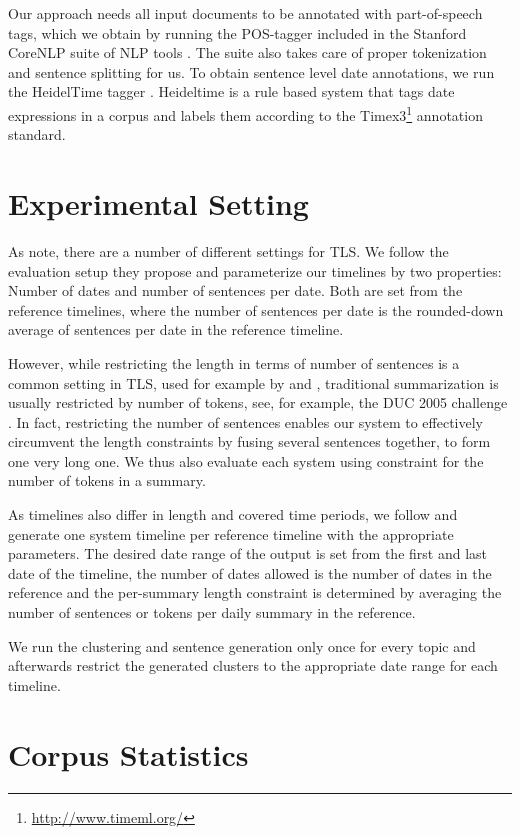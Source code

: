 \documentclass[a4paper,BCOR=10mm]{report}
\numberwithin{lemma}{chapter}
\numberwithin{definition}{chapter}
\begin{document}
Our approach needs all input documents to be annotated with part-of-speech tags, which we obtain by running the POS-tagger included in the Stanford CoreNLP suite of NLP tools \citep{stanford-corenlp}. The suite also takes care of proper tokenization and sentence splitting for us.
To obtain sentence level date annotations, we run the HeidelTime tagger \citet{heideltime}. Heideltime is a rule based system that tags date expressions in a corpus and labels them according to the Timex3\footnote{\url{http://www.timeml.org/}} annotation standard.

\section{Experimental Setting} \label{sec:setup-settings}

As \citet{markert} note, there are a number of different settings for TLS.
We follow the evaluation setup they propose and parameterize our timelines by two properties: Number of dates and number of sentences per date. Both are set from the reference timelines, where the number of sentences per date is the rounded-down average of sentences per date in the reference timeline.

However, while restricting the length in terms of number of sentences is a common setting in TLS, used for example by \citet{chieu} and \citet{yan-trans}, traditional summarization is usually restricted by number of tokens, see, for example, the DUC 2005 challenge \citep{duc2005}. In fact, restricting the number of sentences enables our system to effectively circumvent the length constraints by fusing several sentences together, to form one very long one.
We thus also evaluate each system using constraint for the number of tokens in a summary.

As timelines also differ in length and covered time periods, we follow \citet{markert} and generate one system timeline per reference timeline with the appropriate parameters. The desired date range of the output is set from the first and last date of the timeline, the number of dates allowed is the number of dates in the reference and the per-summary length constraint is determined by averaging the number of sentences or tokens per daily summary in the reference.

We run the clustering and sentence generation only once for every topic and afterwards restrict the generated clusters to the appropriate date range for each timeline.


\section{Corpus Statistics} \label{sec:setup-stats}
\end{document}
